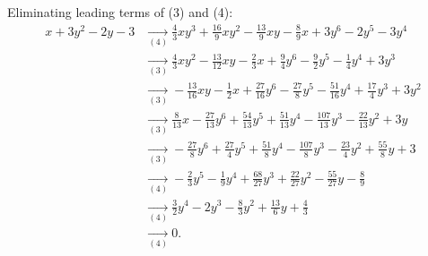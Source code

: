 {Eliminating leading terms of (3) and (4):
\begin{align*}
x+3y^{2}-2y-3&\underset{(4)}{\rightarrow}\frac{4}{3}xy^{3}+\frac{16}{9}xy^{2}-\frac{13}{9}xy-\frac{8}{9}x+3y^{6}-2y^{5}-3y^{4}
\\ &\underset{(3)}{\rightarrow}\frac{4}{3}xy^{2}-\frac{13}{12}xy-\frac{2}{3}x+\frac{9}{4}y^{6}-\frac{9}{2}y^{5}-\frac{1}{4}y^{4}+3y^{3}
\\ &\underset{(3)}{\rightarrow}-\frac{13}{16}xy-\frac{1}{2}x+\frac{27}{16}y^{6}-\frac{27}{8}y^{5}-\frac{51}{16}y^{4}+\frac{17}{4}y^{3}+3y^{2}
\\ &\underset{(3)}{\rightarrow}\frac{8}{13}x-\frac{27}{13}y^{6}+\frac{54}{13}y^{5}+\frac{51}{13}y^{4}-\frac{107}{13}y^{3}-\frac{22}{13}y^{2}+3y
\\ &\underset{(3)}{\rightarrow}-\frac{27}{8}y^{6}+\frac{27}{4}y^{5}+\frac{51}{8}y^{4}-\frac{107}{8}y^{3}-\frac{23}{4}y^{2}+\frac{55}{8}y+3
\\ &\underset{(4)}{\rightarrow}-\frac{2}{3}y^{5}-\frac{1}{9}y^{4}+\frac{68}{27}y^{3}+\frac{22}{27}y^{2}-\frac{55}{27}y-\frac{8}{9}
\\ &\underset{(4)}{\rightarrow}\frac{3}{2}y^{4}-2y^{3}-\frac{8}{3}y^{2}+\frac{13}{6}y+\frac{4}{3}
\\ &\underset{(4)}{\rightarrow}0
.\\ \end{align*}
}